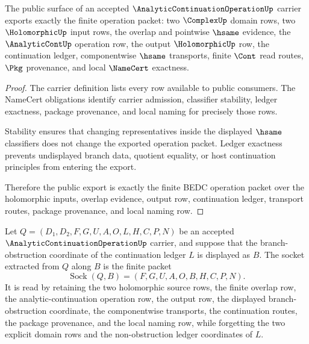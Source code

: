 \begin{theorem}
\label{thm:analytic-continuation-operation-public-export}
The public surface of an accepted $\AnalyticContinuationOperationUp$ carrier exports exactly the finite operation packet: two $\ComplexUp$ domain rows, two $\HolomorphicUp$ input rows, the overlap and pointwise $\hsame$ evidence, the $\AnalyticContUp$ operation row, the output $\HolomorphicUp$ row, the continuation ledger, componentwise $\hsame$ transports, finite $\Cont$ read routes, $\Pkg$ provenance, and local $\NameCert$ exactness.
\end{theorem}
\begin{proof}
The carrier definition lists every row available to public consumers. The NameCert obligations identify carrier admission, classifier stability, ledger exactness, package provenance, and local naming for precisely those rows.

Stability ensures that changing representatives inside the displayed $\hsame$ classifiers does not change the exported operation packet. Ledger exactness prevents undisplayed branch data, quotient equality, or host continuation principles from entering the export.

Therefore the public export is exactly the finite BEDC operation packet over the holomorphic inputs, overlap evidence, output row, continuation ledger, transport routes, package provenance, and local naming row.
\end{proof}

\begin{definition}
\label{def:analytic-continuation-operation-socket-extraction}
Let $Q=(D_1,D_2,F,G,U,A,O,L,H,C,P,N)$ be an accepted $\AnalyticContinuationOperationUp$ carrier, and suppose that the branch-obstruction coordinate of the continuation ledger $L$ is displayed as $B$. The socket extracted from $Q$ along $B$ is the finite packet
$$
\operatorname{Sock}(Q,B)=(F,G,U,A,O,B,H,C,P,N).
$$
It is read by retaining the two holomorphic source rows, the finite overlap row, the analytic-continuation operation row, the output row, the displayed branch-obstruction coordinate, the componentwise transports, the continuation routes, the package provenance, and the local naming row, while forgetting the two explicit domain rows and the non-obstruction ledger coordinates of $L$.
\end{definition}

